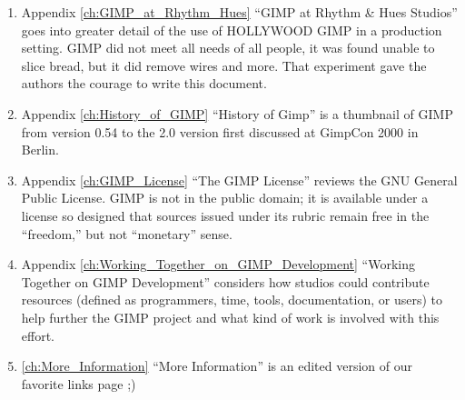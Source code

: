 \begin{enumerate}

\item Appendix  \ref{ch:GIMP_at_Rhythm_Hues}  ``GIMP at Rhythm \& Hues Studios''
goes into greater detail of the use of HOLLYWOOD GIMP in a production
setting. GIMP did not meet all needs of all people, it was found unable to
slice bread, but it did remove wires and more. That experiment gave the 
authors the courage to write this document.

\item Appendix  \ref{ch:History_of_GIMP} ``History of Gimp'' is a thumbnail of GIMP
from version 0.54 to the 2.0 version first discussed at GimpCon 2000 in Berlin.

\item Appendix \ref{ch:GIMP_License} ``The GIMP License'' reviews the GNU General Public License.
GIMP is not in the public domain; it is available under a license so
designed that sources issued under its rubric remain free in the
``freedom,'' but not ``monetary'' sense.

\item Appendix \ref{ch:Working_Together_on_GIMP_Development} ``Working Together on GIMP Development''
considers how studios could contribute resources (defined as programmers, time,
tools, documentation, or users) to help further the GIMP project and
what kind of work is involved with this effort.

\item \ref{ch:More_Information} ``More Information'' is an edited version of our favorite links page ;)

\end{enumerate}